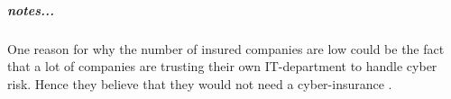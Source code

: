 \subparagraph{notes...}
   One reason for why the number of insured companies are low could be the fact that a lot of companies are trusting their own IT-department to handle cyber risk. Hence they believe that they would not need a cyber-insurance \cite{twatson}. 
   
   
   
   
   
   
   
   
   
   
   
   
   
  

